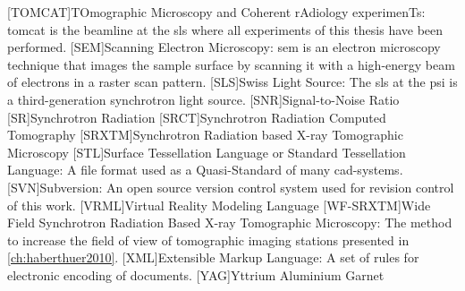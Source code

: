 \begin{acronym}[WF-SRXTM]
		[TOMCAT]{TOmographic Microscopy and Coherent rAdiology experimenTs}: \acs{tomcat} is the beamline at the \acs{sls} where all experiments of this thesis have been performed.
		[SEM]{Scanning Electron Microscopy}: \acs{sem} is an electron microscopy technique that images the sample surface by scanning it with a high-energy beam of electrons in a raster scan pattern.
		[SLS]{Swiss Light Source}: The \acs{sls} at the \acs{psi} is a third-generation synchrotron light source.
		[SNR]{Signal-to-Noise Ratio}
		[SR]{Synchrotron Radiation}
		{Synchrotron Radiation Computed Tomography}
		[SRXTM]{Synchrotron Radiation based X-ray Tomographic Microscopy}
		[STL]{Surface Tessellation Language or Standard Tessellation Language}: A file format used as a Quasi-Standard of many \acs{cad}-systems.
		[SVN]{Subversion}: An open source version control system used for revision control of this work.
		{Virtual Reality Modeling Language}
		[WF-SRXTM]{Wide Field Synchrotron Radiation Based X-ray Tomographic Microscopy}: The method to increase the field of view of tomographic imaging stations presented in \autoref{ch:haberthuer2010}.
		[XML]{Extensible Markup Language}: A set of rules for electronic encoding of documents.
		[YAG]{Yttrium Aluminium Garnet}
	\end{acronym}
\endgroup